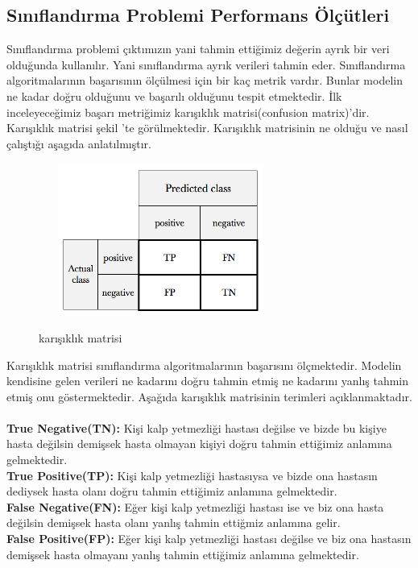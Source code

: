 \documentclass[conference]{IEEEtran}
\begin{document}
\subsection{Sınıflandırma Problemi Performans Ölçütleri}
Sınıflandırma problemi çıktımızın yani tahmin ettiğimiz değerin ayrık bir veri olduğunda kullanılır. Yani sınıflandırma ayrık verileri tahmin eder. Sınıflandırma algoritmalarının başarısının ölçülmesi için bir kaç metrik vardır. Bunlar modelin ne kadar doğru olduğunu ve başarılı olduğunu tespit etmektedir. İlk inceleyeceğimiz başarı metriğimiz karışıklık matrisi(confusion matrix)'dir. Karışıklık matrisi şekil 'te görülmektedir. Karışıklık matrisinin ne olduğu ve nasıl çalıştığı aşagıda anlatılmıştır.
\begin{figure}[htbp]
    \centering
   	\includegraphics[width=8cm, height=5cm]{images/matris.PNG}\\
	\caption{karışıklık matrisi\cite{confmat}}
    \label{fig}
\end{figure}
Karışıklık matrisi sınıflandırma algoritmalarının başarısını ölçmektedir. Modelin kendisine gelen verileri ne kadarını doğru tahmin etmiş ne kadarını yanlış tahmin etmiş onu göstermektedir. Aşağıda karışıklık matrisinin terimleri açıklanmaktadır.\\\\ 
\textbf{True Negative(TN):} Kişi kalp yetmezliği hastası değilse ve bizde bu kişiye hasta değilsin demişsek hasta olmayan kişiyi doğru tahmin ettiğimiz anlamına gelmektedir.\\
\textbf{True Positive(TP):} Kişi kalp yetmezliği hastasıysa ve bizde ona hastasın dediysek hasta olanı doğru tahmin ettiğimiz anlamına gelmektedir.\\
\textbf{False Negative(FN):} Eğer kişi kalp yetmezliği hastası ise ve biz ona hasta değilsin demişsek hasta olanı yanlış tahmin ettiğmiz anlamına gelir.\\
\textbf{False Positive(FP):} Eğer kişi kalp yetmezliği hastası değilse ve biz ona hastasın demişsek hasta olmayanı yanlış tahmin ettiğimiz anlamına gelmektedir.
\end{document}
